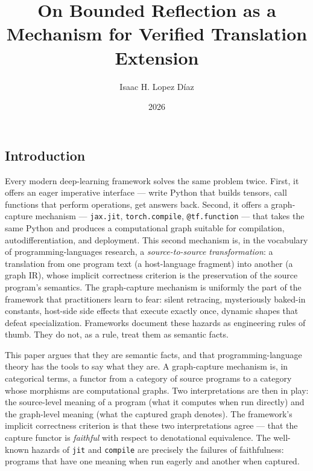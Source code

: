 \documentclass[11pt]{report}
\title{On Bounded Reflection as a Mechanism for Verified Translation Extension}
\author{Isaac H. Lopez D\'iaz}
\date{2026}
\theoremstyle{definition}
\begin{document}
\maketitle

\setcounter{page}{2}

\makeabstract
\tableofcontents

\begin{mainf}

%
%

\chapter{Introduction}
\label{ch:introduction}


Every modern deep-learning framework solves the same problem twice. First, it offers an eager imperative interface --- write Python that builds tensors, call functions that perform operations, get answers back. Second, it offers a graph-capture mechanism --- \texttt{jax.jit}, \texttt{torch.compile}, \texttt{@tf.function} --- that takes the same Python and produces a computational graph suitable for compilation, autodifferentiation, and deployment. This second mechanism is, in the vocabulary of programming-languages research, a \emph{source-to-source transformation}: a translation from one program text (a host-language fragment) into another (a graph IR), whose implicit correctness criterion is the preservation of the source program's semantics. The graph-capture mechanism is uniformly the part of the framework that practitioners learn to fear: silent retracing, mysteriously baked-in constants, host-side side effects that execute exactly once, dynamic shapes that defeat specialization. Frameworks document these hazards as engineering rules of thumb. They do not, as a rule, treat them as semantic facts.

This paper argues that they are semantic facts, and that programming-language theory has the tools to say what they are. A graph-capture mechanism is, in categorical terms, a functor from a category of source programs to a category whose morphisms are computational graphs. Two interpretations are then in play: the source-level meaning of a program (what it computes when run directly) and the graph-level meaning (what the captured graph denotes). The framework's implicit correctness criterion is that these two interpretations agree --- that the capture functor is \emph{faithful} with respect to denotational equivalence. The well-known hazards of \texttt{jit} and \texttt{compile} are precisely the failures of faithfulness: programs that have one meaning when run eagerly and another when captured.


\end{mainf}
\end{document}
